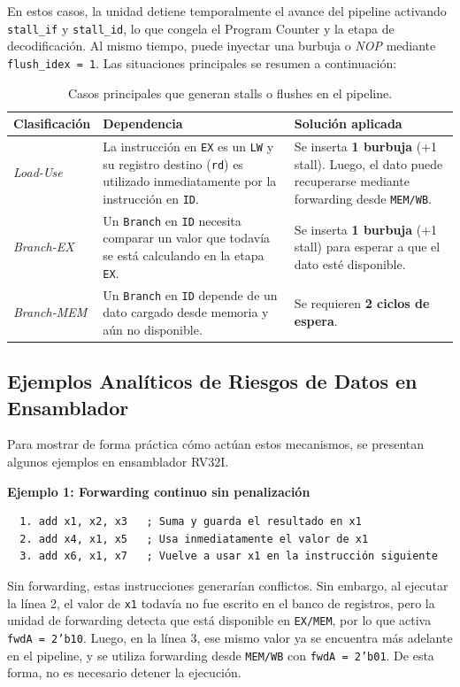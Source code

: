 En estos casos, la unidad detiene temporalmente el avance del pipeline activando \texttt{stall\_if} y \texttt{stall\_id}, lo que congela el Program Counter y la etapa de decodificación. Al mismo tiempo, puede inyectar una burbuja o \textit{NOP} mediante \texttt{flush\_idex = 1}. Las situaciones principales se resumen a continuación:

\begin{table}[h]
\centering
\begin{tabular}{|l|p{5cm}|p{7cm}|}
\hline
\textbf{Clasificación} & \textbf{Dependencia} & \textbf{Solución aplicada} \\ \hline
\textit{Load-Use} & La instrucción en \texttt{EX} es un \texttt{LW} y su registro destino (\texttt{rd}) es utilizado inmediatamente por la instrucción en \texttt{ID}. & Se inserta \textbf{1 burbuja} (+1 stall). Luego, el dato puede recuperarse mediante forwarding desde \texttt{MEM/WB}. \\ \hline
\textit{Branch-EX} & Un \texttt{Branch} en \texttt{ID} necesita comparar un valor que todavía se está calculando en la etapa \texttt{EX}. & Se inserta \textbf{1 burbuja} (+1 stall) para esperar a que el dato esté disponible. \\ \hline
\textit{Branch-MEM} & Un \texttt{Branch} en \texttt{ID} depende de un dato cargado desde memoria y aún no disponible. & Se requieren \textbf{2 ciclos de espera}. \\ \hline
\end{tabular}
\caption{Casos principales que generan stalls o flushes en el pipeline.}
\end{table}

\subsection{Ejemplos Analíticos de Riesgos de Datos en Ensamblador}
Para mostrar de forma práctica cómo actúan estos mecanismos, se presentan algunos ejemplos en ensamblador RV32I.

\textbf{Ejemplo 1: Forwarding continuo sin penalización}
\begin{verbatim}
  1. add x1, x2, x3   ; Suma y guarda el resultado en x1
  2. add x4, x1, x5   ; Usa inmediatamente el valor de x1
  3. add x6, x1, x7   ; Vuelve a usar x1 en la instrucción siguiente
\end{verbatim}

Sin forwarding, estas instrucciones generarían conflictos. Sin embargo, al ejecutar la línea 2, el valor de \texttt{x1} todavía no fue escrito en el banco de registros, pero la unidad de forwarding detecta que está disponible en \texttt{EX/MEM}, por lo que activa \texttt{fwdA = 2'b10}. Luego, en la línea 3, ese mismo valor ya se encuentra más adelante en el pipeline, y se utiliza forwarding desde \texttt{MEM/WB} con \texttt{fwdA = 2'b01}. De esta forma, no es necesario detener la ejecución.

